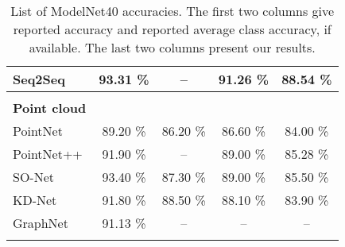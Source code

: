 \begin{table}[]
\begin{tabular}{lcccc}
		Seq2Seq              &      93.31 \%      &           --            &     91.26 \%      &        88.54 \%         \\ \hline
		                     &                    &                         &                   &                         \\
		\textbf{Point cloud} &                    &                         &                   &                         \\
		PointNet             &      89.20 \%      &        86.20 \%         &     86.60 \%      &        84.00 \%         \\
		PointNet++           &      91.90 \%      &           --            &     89.00 \%      &        85.28 \%         \\
		SO-Net               &      93.40 \%      &        87.30 \%         &     89.00 \%      &        85.50 \%         \\
		KD-Net               &      91.80 \%      &        88.50 \%         &     88.10 \%      &        83.90 \%         \\
		GraphNet             &      91.13 \%      &           --            &        --         &           --            \\ \hline
		                     &                    &                         &                   &
	\end{tabular}
\caption{List of ModelNet40 accuracies. The first two columns give reported accuracy and reported average class accuracy, if available. The last two columns present our results.}
\label{Table:accs}
\end{table}